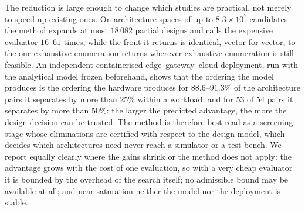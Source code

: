 \documentclass[pdflatex,sn-nature,lineno]{sn-jnl}
\newcommand{\EvalRange}{16\text{--}61}
\newcommand{\WithinAgreementRange}{88.6\text{--}91.3}
\newcommand{\MaxStates}{18\,082}
\newcommand{\ReliabilityFifty}{53 of 54}
\begin{document}
The reduction is large enough to change which studies are practical, not merely to speed up existing ones. On
architecture spaces of up to $8.3\times10^{7}$ candidates the method expands at most
$\MaxStates$ partial designs and calls the expensive evaluator $\EvalRange$ times, while the
front it returns is identical, vector for vector, to the one exhaustive enumeration
returns wherever exhaustive enumeration is still feasible. An independent containerised
edge--gateway--cloud deployment, run with the analytical model frozen beforehand, shows
that the ordering the model produces is the ordering the hardware produces for
$\WithinAgreementRange\%$ of the architecture pairs it separates by more than $25\%$
within a workload, and for \ReliabilityFifty{} pairs it separates by more than $50\%$:
the larger the predicted advantage, the more the design decision can be trusted. The
method is therefore best read as a screening stage whose eliminations are certified with
respect to the design model, which decides which architectures need never reach a
simulator or a test bench. We report equally clearly where the gains shrink or the method does not apply: the
advantage grows with the cost of one evaluation, so with a very cheap evaluator it is
bounded by the overhead of the search itself; no admissible bound may be available at
all; and near saturation neither the model nor the deployment is stable.
\end{document}
